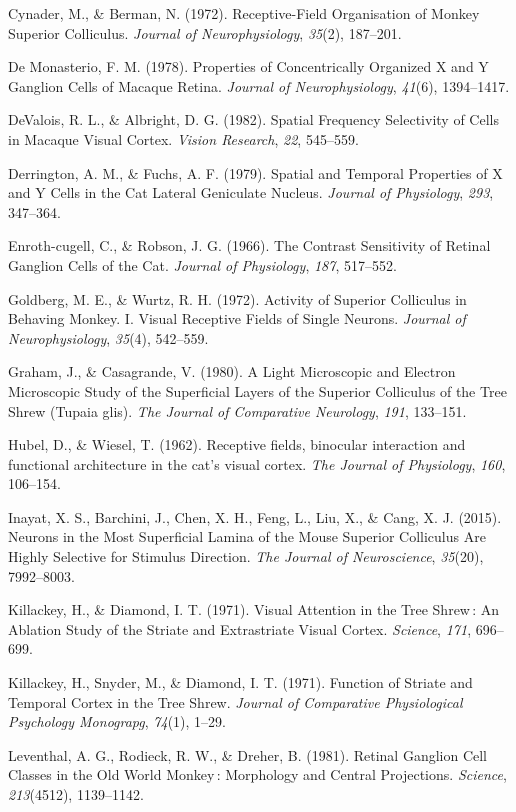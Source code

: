 Cynader, M., \& Berman, N. (1972). Receptive-Field Organisation of
Monkey Superior Colliculus. \emph{Journal of Neurophysiology},
\emph{35}(2), 187--201.

De Monasterio, F. M. (1978). Properties of Concentrically Organized X
and Y Ganglion Cells of Macaque Retina. \emph{Journal of
Neurophysiology}, \emph{41}(6), 1394--1417.

DeValois, R. L., \& Albright, D. G. (1982). Spatial Frequency
Selectivity of Cells in Macaque Visual Cortex. \emph{Vision Research},
\emph{22}, 545--559.

Derrington, A. M., \& Fuchs, A. F. (1979). Spatial and Temporal
Properties of X and Y Cells in the Cat Lateral Geniculate Nucleus.
\emph{Journal of Physiology}, \emph{293}, 347--364.

Enroth-cugell, C., \& Robson, J. G. (1966). The Contrast Sensitivity of
Retinal Ganglion Cells of the Cat. \emph{Journal of Physiology},
\emph{187}, 517--552.

Goldberg, M. E., \& Wurtz, R. H. (1972). Activity of Superior Colliculus
in Behaving Monkey. I. Visual Receptive Fields of Single Neurons.
\emph{Journal of Neurophysiology}, \emph{35}(4), 542--559.

Graham, J., \& Casagrande, V. (1980). A Light Microscopic and Electron
Microscopic Study of the Superficial Layers of the Superior Colliculus
of the Tree Shrew (Tupaia glis). \emph{The Journal of Comparative
Neurology}, \emph{191}, 133--151.

Hubel, D., \& Wiesel, T. (1962). Receptive fields, binocular interaction
and functional architecture in the cat's visual cortex. \emph{The
Journal of Physiology}, \emph{160}, 106--154.

Inayat, X. S., Barchini, J., Chen, X. H., Feng, L., Liu, X., \& Cang, X.
J. (2015). Neurons in the Most Superficial Lamina of the Mouse Superior
Colliculus Are Highly Selective for Stimulus Direction. \emph{The
Journal of Neuroscience}, \emph{35}(20), 7992--8003.

Killackey, H., \& Diamond, I. T. (1971). Visual Attention in the Tree
Shrew\,: An Ablation Study of the Striate and Extrastriate Visual
Cortex. \emph{Science}, \emph{171}, 696--699.

Killackey, H., Snyder, M., \& Diamond, I. T. (1971). Function of Striate
and Temporal Cortex in the Tree Shrew. \emph{Journal of Comparative
Physiological Psychology Monograpg}, \emph{74}(1), 1--29.

Leventhal, A. G., Rodieck, R. W., \& Dreher, B. (1981). Retinal Ganglion
Cell Classes in the Old World Monkey\,: Morphology and Central
Projections. \emph{Science}, \emph{213}(4512), 1139--1142.

